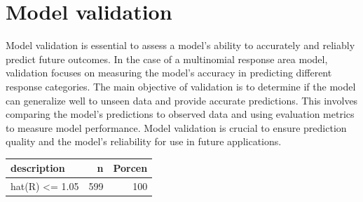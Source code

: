 \documentclass[
  12pt,
]{book}
\newenvironment{Shaded}{\begin{snugshade}}{\end{snugshade}}
\newcommand{\AttributeTok}[1]{\textcolor[rgb]{0.13,0.29,0.53}{#1}}
\newcommand{\CommentTok}[1]{\textcolor[rgb]{0.56,0.35,0.01}{\textit{#1}}}
\newcommand{\DecValTok}[1]{\textcolor[rgb]{0.00,0.00,0.81}{#1}}
\newcommand{\FunctionTok}[1]{\textcolor[rgb]{0.13,0.29,0.53}{\textbf{#1}}}
\newcommand{\NormalTok}[1]{#1}
\newcommand{\OtherTok}[1]{\textcolor[rgb]{0.56,0.35,0.01}{#1}}
\newcommand{\SpecialCharTok}[1]{\textcolor[rgb]{0.81,0.36,0.00}{\textbf{#1}}}
\newcommand{\StringTok}[1]{\textcolor[rgb]{0.31,0.60,0.02}{#1}}
\begin{document}
\hypertarget{model-validation}{%
\section{Model validation}\label{model-validation}}

Model validation is essential to assess a model's ability to accurately and reliably predict future outcomes. In the case of a multinomial response area model, validation focuses on measuring the model's accuracy in predicting different response categories. The main objective of validation is to determine if the model can generalize well to unseen data and provide accurate predictions. This involves comparing the model's predictions to observed data and using evaluation metrics to measure model performance. Model validation is crucial to ensure prediction quality and the model's reliability for use in future applications.

\begin{Shaded}
\end{Shaded}

\begin{table}[H]
\centering
\centering
\begin{tabular}[t]{lrr}
\toprule
description & n & Porcen\\
\midrule
hat(R) <= 1.05 & 599 & 100\\
\bottomrule
\end{tabular}
\end{table}
\end{document}
